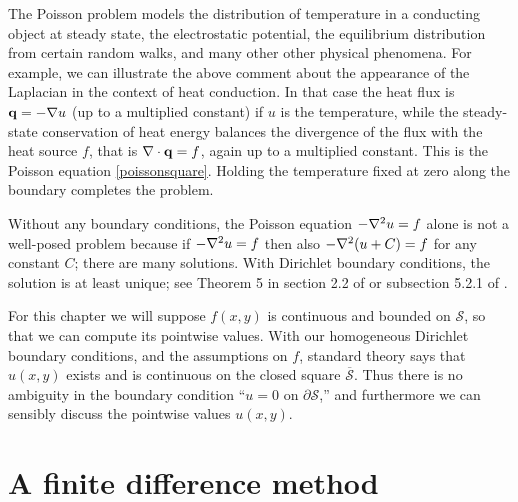 The Poisson problem models the distribution of temperature in a conducting object at steady state, the electrostatic potential, the equilibrium distribution from certain random walks, and many other other physical phenomena.  For example, we can illustrate the above comment about the appearance of the Laplacian in the context of heat conduction.  In that case the heat flux is $\mathbf{q} = - \nabla u$ (up to a multiplied constant) if $u$ is the temperature, while the steady-state conservation of heat energy balances the divergence of the flux with the heat source $f$, that is $\nabla\cdot \mathbf{q} = f$, again up to a multiplied constant.  This is the Poisson equation \eqref{poissonsquare}.  Holding the temperature fixed at zero along the boundary completes the problem.

Without any boundary conditions, the Poisson equation $-\nabla^2 u = f$ alone is not a well-posed problem because if $-\nabla^2 u = f$ then also $-\nabla^2(u+C)=f$ for any constant $C$; there are many solutions.  With Dirichlet boundary conditions, the solution is at least unique; see Theorem 5 in section 2.2 of \citet{Evans} or subsection 5.2.1 of \citet{Ockendonetal2003}.

For this chapter we will suppose $f(x,y)$ is continuous and bounded on $\mathcal{S}$, so that we can compute its pointwise values.  With our homogeneous Dirichlet boundary conditions, and the assumptions on $f$, standard theory says that $u(x,y)$ exists and is continuous on the closed square $\overline{\mathcal{S}}$.  Thus there is no ambiguity in the boundary condition ``$u=0$ on $\partial \mathcal{S}$,'' and furthermore we can sensibly discuss the pointwise values $u(x,y)$.


\section{A finite difference method}

